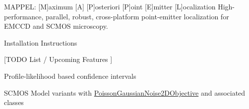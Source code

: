 M\+A\+P\+P\+EL\+: \mbox{[}M\mbox{]}aximum \mbox{[}A\mbox{]} \mbox{[}P\mbox{]}osteriori \mbox{[}P\mbox{]}oint \mbox{[}E\mbox{]}mitter \mbox{[}L\mbox{]}ocalization High-\/performance, parallel, robust, cross-\/platform point-\/emitter localization for E\+M\+C\+CD and S\+C\+M\+OS microscopy.


\begin{DoxyItemize}
\item Installation Instructions
\item \mbox{[}T\+O\+DO List / Upcoming Features \mbox{]}
\begin{DoxyItemize}
\item Profile-\/likelihood based confidence intervals
\item S\+C\+M\+OS Model variants with \hyperlink{classPoissonGaussianNoise2DObjective}{Poisson\+Gaussian\+Noise2\+D\+Objective} and associated classes 
\end{DoxyItemize}
\end{DoxyItemize}